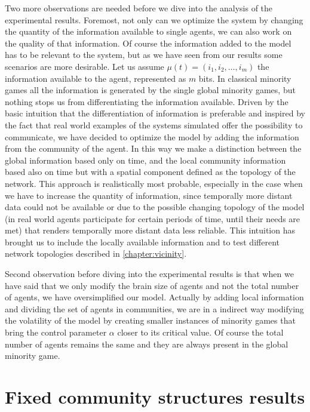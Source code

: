 Two more observations are needed before we dive into the analysis of the experimental results.
Foremost, not only can we optimize the system by changing the quantity of the information available to single agents, we can also work on the quality of that information. Of course the information added to the model has to be relevant to the system, but as we have seen from our results some scenarios are more desirable.
Let us assume $\mu(t) = (i_1,i_2,\ldots,i_m)$ the information available to the agent, represented as $m$ bits.
In classical minority games all the information is generated by the single global minority games, but nothing stops us from differentiating the information available.
Driven by the basic intuition that the differentiation of information is preferable and inspired by the fact that real world examples of the systems simulated offer the possibility to communicate, we have decided to optimize the model by adding the information from the community of the agent.
In this way we make a distinction between the global information based only on time, and the local community information based also on time but with a spatial component defined as the topology of the network.
This approach is realistically most probable, especially in the case when we have to increase the quantity of information, since temporally more distant data could not be available or due to the possible changing topology of the model (in real world agents participate for certain periods of time, until their needs are met) that renders temporally more distant data less reliable.
This intuition has brought us to include the locally available information and to test different network topologies described in \ref{chapter:vicinity}.

Second observation before diving into the experimental results is that when we have said that we only modify the brain size of agents and not the total number of agents, we have oversimplified our model.
Actually by adding local information and dividing the set of agents in communities, we are in a indirect way modifying the volatility of the model by creating smaller instances of minority games that bring the control parameter $\alpha$ closer to its critical value.
Of course the total number of agents remains the same and they are always present in the global minority game.

\section{Fixed community structures results}
\label{sec:fixed}

